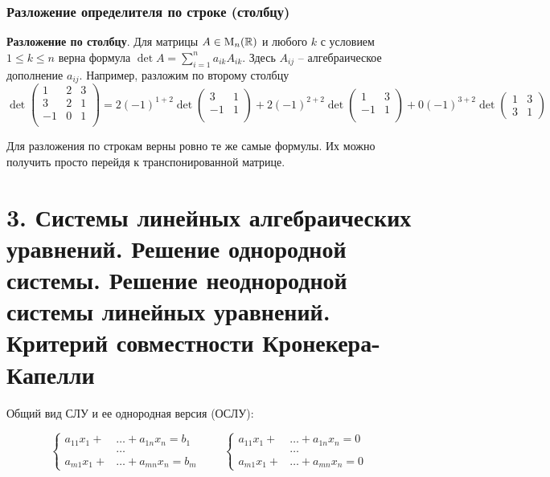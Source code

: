 \documentclass{article}
\begin{document}
\subsubsection*{Разложение определителя по строке (столбцу)}


\textbf{Разложение по столбцу}. Для матрицы $A\in \operatorname{M}_{n}(\mathbb R)$ и любого $k$ с условием $1\leqslant k \leqslant n$ верна формула $\det A = \sum_{i = 1} ^ n a_{ik} A_{ik}$. Здесь $A_{ij}$ -- алгебраическое дополнение $a_{ij}$. Например, разложим по второму столбцу
\[
\det\begin{pmatrix}
	{1}&{2}&{3}\\
	{3}&{2}&{1}\\
	{-1}&{0}&{1}\\
\end{pmatrix}=
2 (-1)^{1 + 2} 
\det
\begin{pmatrix}
	{3}&{1}\\
	{-1}&{1}\\
\end{pmatrix}+
2 (-1)^{2+2}
\det
\begin{pmatrix}
	{1}&{3}\\
	{-1}&{1}\\
\end{pmatrix} +
0 (-1)^{3+2}
\det
\begin{pmatrix}
	{1}&{3}\\
	{3}&{1}
\end{pmatrix}
\]

Для разложения по строкам верны ровно те же самые формулы. Их можно получить просто перейдя к транспонированной матрице.
\newpage




\section*{3. Системы линейных алгебраических уравнений. Решение однородной системы. Решение неоднородной системы линейных уравнений. Критерий совместности Кронекера-Капелли}

Общий вид СЛУ и ее однородная версия (ОСЛУ):

\[
\left\{
\begin{aligned}
	a_{11}x_1 + &\ldots + a_{1n}x_n = b_1\\
	&\ldots \\
	a_{m1}x_1 + &\ldots + a_{mn}x_n = b_m
\end{aligned}
\right.\quad\quad
\left\{
\begin{aligned}
	a_{11}x_1 + &\ldots + a_{1n}x_n = 0\\
	&\ldots \\
	a_{m1}x_1 + &\ldots + a_{mn}x_n = 0
\end{aligned}
\right.
\]
\end{document}
